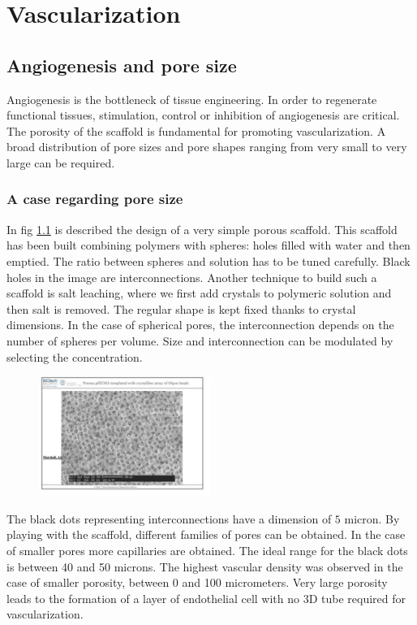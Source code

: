 \graphicspath{{chapters/09/images/}}
\chapter{Vascularization}

\section{Angiogenesis and pore size}
Angiogenesis is the bottleneck of tissue engineering.
In order to regenerate functional tissues, stimulation, control or inhibition of angiogenesis are critical.
The porosity of the scaffold is fundamental for promoting vascularization.
A broad distribution of pore sizes and pore shapes ranging from very small to very large can be required.

	\subsection{A case regarding pore size}
	In fig \ref{fig:pores} is described the design of a very simple porous scaffold.
	This scaffold has been built combining polymers with spheres: holes filled with water and then emptied.
	The ratio between spheres and solution has to be tuned carefully.
	Black holes in the image are interconnections.
	Another technique to build such a scaffold is salt leaching, where we first add crystals to polymeric solution and then salt is removed.
	The regular shape is kept fixed thanks to crystal dimensions.
	In the case of spherical pores, the interconnection depends on the number of spheres per volume.
	Size and interconnection can be modulated by selecting the concentration.

	\begin{figure}[h]
		\centering
		\includegraphics[width=0.5\textwidth]{pores}
		\caption{\label{fig:pores}}
	\end{figure}

	The black dots representing interconnections have a dimension of $5$ micron.
	By playing with the scaffold, different families of pores can be obtained.
	In the case of smaller pores more capillaries are obtained.
	The ideal range for the black dots is between 40 and 50 microns.
	The highest vascular density was observed in the case of smaller porosity, between 0 and 100 micrometers.
	Very large porosity leads to the formation of a layer of endothelial cell with no 3D tube required for vascularization.

